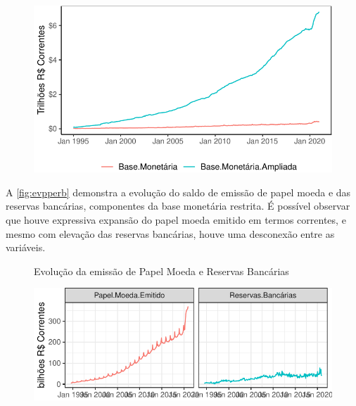 \documentclass[12pt,12pt,openright,oneside,a4paper,chapter=TITLE,section=TITLE,subsection=TITLE,subsubsection=TITLE,english,french,spanish,portugues,sumario=tradicional]{abntex2}
\begin{document}
\begin{figure}

\begin{center}\includegraphics{12-exportedfigures/money base.d-1} \end{center}
\label{fig:moneybases}
\end{figure}

A \autoref{fig:evpperb} demonstra a evolução do saldo de emissão de papel moeda e das reservas bancárias, componentes da base monetária restrita. É possível observar que houve expressiva expansão do papel moeda emitido em termos correntes, e mesmo com elevação das reservas bancárias, houve uma desconexão entre as variáveis.

\begin{figure}
 {Evolução da emissão de Papel Moeda e Reservas Bancárias}

\begin{center}\includegraphics{12-exportedfigures/base moneybase restrict-1} \end{center}
\label{fig:evpperb}
\end{figure}
\end{document}
